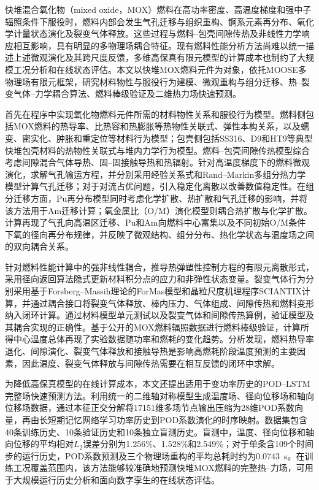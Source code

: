 \begin{chineseabstract}

快堆混合氧化物（mixed oxide，MOX）燃料在高功率密度、高温度梯度和强中子辐照条件下服役时，燃料内部会发生气孔迁移与组织重构、锕系元素再分布、氧化学计量状态演化及裂变气体释放。这些过程与燃料--包壳间隙传热及非线性力学响应相互影响，具有明显的多物理场耦合特征。现有燃料性能分析方法尚难以统一描述上述微观演化及其跨尺度反馈，多维高保真有限元模型的计算成本也制约了大规模工况分析和在线状态评估。本文以快堆MOX燃料元件为对象，依托MOOSE多物理场有限元框架，研究材料物性与服役行为建模、微观重构与组分迁移、热--裂变气体--力学耦合算法、燃料棒级验证及二维热力场快速预测。

首先在程序中实现氧化物燃料元件所需的材料物性关系和服役行为模型。燃料侧包括MOX燃料的热导率、比热容和热膨胀等热物性关联式、弹性本构关系，以及蠕变、密实化、肿胀和重定位等材料行为模型；包壳侧包括SS316、D9和HT9等典型快堆包壳材料的热物性关联式与堆内力学行为模型。燃料--包壳间隙传热模型综合考虑间隙混合气体导热、固--固接触导热和热辐射。针对高温度梯度下的燃料微观演化，求解气孔输运方程，并分别采用经验关系式和Rand--Markin多组分热力学模型计算气孔迁移；对于对流占优问题，引入稳定化离散以改善数值稳定性。在组分迁移方面，Pu再分布模型同时考虑化学扩散、热扩散和气孔迁移的影响，并将该方法用于Am迁移计算；氧金属比（O/M）演化模型则耦合热扩散与化学扩散。计算再现了气孔向高温区迁移、Pu和Am向燃料中心富集以及不同初始O/M条件下氧的径向再分布规律，并反映了微观结构、组分分布、热化学状态与温度场之间的双向耦合关系。

针对燃料性能计算中的强非线性耦合，推导热弹塑性控制方程的有限元离散形式，采用径向返回算法隐式更新材料积分点的应力和非弹性状态变量。裂变气体行为分别采用基于Forsberg--Massih理论的ForMas模型和晶粒尺度机理程序SCIANTIX计算，并通过耦合接口将裂变气体释放、棒内压力、气体组成、间隙传热和燃料变形纳入闭环计算。通过材料模型单元测试以及裂变气体和间隙传热算例，验证模型及其耦合实现的正确性。基于公开的MOX燃料辐照数据进行燃料棒级验证，计算所得中心温度总体再现了实验数据随功率和燃耗的变化趋势。分析发现，燃料热导率退化、间隙演化、裂变气体释放和接触导热是影响高燃耗阶段温度预测的主要因素，因此温度、裂变气体释放与间隙传热需要在相互反馈的闭环中求解。

为降低高保真模型的在线计算成本，本文还提出适用于变功率历史的POD--LSTM完整场快速预测方法。利用统一的二维轴对称模型生成温度场、径向位移场和轴向位移场数据，通过本征正交分解将17151维多场节点输出压缩为28维POD系数向量，再由长短期记忆网络学习功率历史到POD系数演化的时序映射。数据集包含40条训练历史、10条验证历史和10条独立盲测历史。盲测中，温度、径向位移和轴向位移的平均相对$L_2$误差分别为1.256\%、1.528\%和2.549\%；对于单条含109个时间步的运行历史，POD系数预测及三个物理场重构的平均总耗时约为0.0743~s。在训练工况覆盖范围内，该方法能够较准确地预测快堆MOX燃料的完整热--力场，可用于大规模运行历史分析和面向数字孪生的在线状态评估。


\end{chineseabstract}
